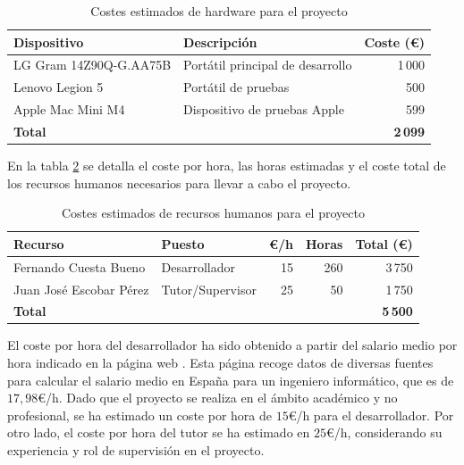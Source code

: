 \begin{table}[!ht]
      \centering
      \begin{tabular}{|l|l|r|}
            \hline
            \textbf{Dispositivo}   & \textbf{Descripción}             & \textbf{Coste (€)} \\
            \hline
            LG Gram 14Z90Q-G.AA75B & Portátil principal de desarrollo & 1\,000             \\
            Lenovo Legion 5        & Portátil de pruebas              & 500                \\
            Apple Mac Mini M4      & Dispositivo de pruebas Apple     & 599                \\
            \hline
            \textbf{Total}         &                                  & \textbf{2\,099}    \\
            \hline
      \end{tabular}
      \caption{Costes estimados de hardware para el proyecto}
      \label{tab:costes-hardware}
\end{table}

En la tabla \ref{tab:recursos-humanos} se detalla el coste por hora, las horas estimadas y el coste total de los recursos humanos necesarios para llevar a cabo el proyecto.

\begin{table}[!ht]
      \centering
      \begin{tabular}{|l|l|r|r|r|}
            \hline
            \textbf{Recurso}        & \textbf{Puesto}  & \textbf{€/h} & \textbf{Horas} & \textbf{Total (€)} \\
            \hline
            Fernando Cuesta Bueno   & Desarrollador    & 15           & 260            & 3\,750             \\
            Juan José Escobar Pérez & Tutor/Supervisor & 25           & 50             & 1\,750             \\
            \hline
            \textbf{Total}          &                  &              &                & \textbf{5\,500}    \\
            \hline
      \end{tabular}
      \caption{Costes estimados de recursos humanos para el proyecto}
      \label{tab:recursos-humanos}
\end{table}

El coste por hora del desarrollador ha sido obtenido a partir del salario medio por hora indicado en la página web \cite{joobleIngenieroInformatico}. Esta página recoge datos de diversas fuentes para calcular el salario medio en España para un ingeniero informático, que es de $17,98$€/h. Dado que el proyecto se realiza en el ámbito académico y no profesional, se ha estimado un coste por hora de $15$€/h para el desarrollador. Por otro lado, el coste por hora del tutor se ha estimado en $25$€/h, considerando su experiencia y rol de supervisión en el proyecto.

